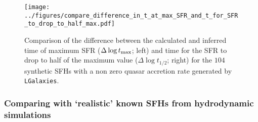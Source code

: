 \documentclass[useAMS,usenatbib]{mn2e}
\begin{document}
\begin{figure}
\centering
\texttt{[image: ../figures/compare\_difference\_in\_t\_at\_max\_SFR\_and\_t\_for\_SFR\_to\_drop\_to\_half\_max.pdf]}
\caption{Comparison of the difference between the calculated and inferred time of maximum SFR ($\Delta \log t_{\rm{max}}$; left) and time for the SFR to drop to half of the maximum value ($\Delta \log t_{1/2}$; right) for the $104$ synthetic SFHs with a non zero quasar accretion rate generated by \texttt{LGalaxies}.}
\label{fig:genlgalsfhs}
\end{figure}






\subsubsection{Comparing with `realistic' known SFHs from hydrodynamic simulations}\label{sec:lgalaxies}
\end{document}
